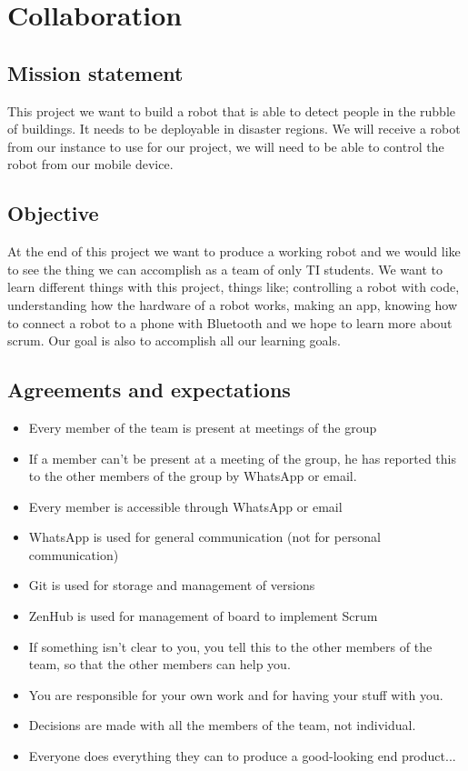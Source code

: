 \section{Collaboration}

\subsection{Mission statement}
This project we want to build a robot that is able to detect people in the rubble of buildings. It needs to be deployable in disaster regions. We will receive a robot from our instance to use for our project, we will need to be able to control the robot from our mobile device.

\subsection{Objective}
At the end of this project we want to produce a working robot and we would like to see the thing we can accomplish as a team of only TI students. We want to learn different things with this project, things like; controlling a robot with code, understanding how the hardware of a robot works, making an app, knowing how to connect a robot to a phone with Bluetooth and we hope to learn more about scrum. Our goal is also to accomplish all our learning goals.

\subsection{Agreements and expectations}
\begin{itemize}
	\item Every member of the team is present at meetings of the group
	\item If a member can’t be present at a meeting of the group, he has reported this to the other members of the group by WhatsApp or email.
	\item Every member is accessible through WhatsApp or email
	\item WhatsApp is used for general communication (not for personal communication)
	\item Git is used for storage and management of versions
	\item ZenHub is used for management of board to implement Scrum
	\item If something isn’t clear to you, you tell this to the other members of the team, so that the other members can help you.
	\item You are responsible for your own work and for having your stuff with you.
	\item Decisions are made with all the members of the team, not individual.
	\item Everyone does everything they can to produce a good-looking end product...
\end{itemize}

